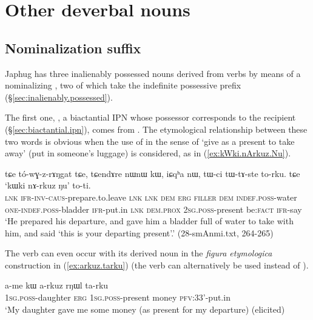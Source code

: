 \section{Other deverbal nouns}


\subsection{Nominalization  suffix} \label{sec:z.nmlz}
Japhug has three inalienably possessed nouns derived from verbs by means of a nominalizing , two of which take the indefinite possessive prefix  (§\ref{sec:inalienably.possessed}).

The first one, , a biactantial IPN whose possessor corresponds to the recipient (§\ref{sec:biactantial.ipn}), comes from . The etymological relationship  between these two words is obvious when the use of   in the sense of `give as a present to take away' (put in someone's luggage) is considered, as in (\ref{ex:kWki.nArkuz.Nu}).

\begin{exe}
\ex \label{ex:kWki.nArkuz.Nu}
\gll tɕe tó-wɣ-z-rɤŋgat tɕe, tɕendɤre nɯnɯ kɯ, iɕqʰa nɯ,  tɯ-ci tɯ-tɤ-ste to-rku. tɕe `kɯki nɤ-rkuz ŋu' to-ti. \\
\textsc{lnk} \textsc{ifr}-\textsc{inv}-\textsc{caus}-prepare.to.leave \textsc{lnk} \textsc{lnk} \textsc{dem} \textsc{erg} \textsc{filler} \textsc{dem} \textsc{indef}.\textsc{poss}-water \textsc{one}-\textsc{indef}.\textsc{poss}-bladder \textsc{ifr}-put.in \textsc{lnk} \textsc{dem}.\textsc{prox} \textsc{2sg}.\textsc{poss}-present be:\textsc{fact} \textsc{ifr}-say \\
\glt `He prepared his departure, and gave him a bladder full of water to take with him, and said `this is your departing present'.' (28-smAnmi.txt, 264-265)
\end{exe}


The verb  can even occur with its derived noun  in the \textit{figura etymologica} construction in (\ref{ex:arkuz.tarku}) (the verb  can alternatively be used instead of ).

\begin{exe}
\ex \label{ex:arkuz.tarku}
\gll a-me kɯ a-rkuz rŋɯl ta-rku \\
\textsc{1sg}.\textsc{poss}-daughter \textsc{erg} \textsc{1sg}.\textsc{poss}-present money \textsc{pfv}:3\fl{}3'-put.in \\
\glt `My daughter gave me some money (as present for my departure) (elicited)
\end{exe}

